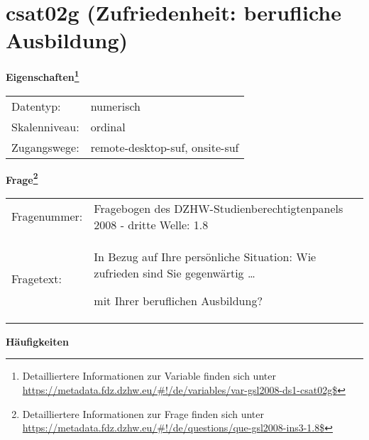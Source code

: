 
    \setcounter{footnote}{0}

    \vspace*{-1.8cm}
	\section{csat02g (Zufriedenheit: berufliche Ausbildung)}
	\label{section:csat02g}



    \vspace*{0.5cm}
    \noindent\textbf{Eigenschaften\footnote{Detailliertere Informationen zur Variable finden sich unter
		\url{https://metadata.fdz.dzhw.eu/\#!/de/variables/var-gsl2008-ds1-csat02g$}}}\\
	\begin{tabularx}{\hsize}{@{}lX}
	Datentyp: & numerisch \\
	Skalenniveau: & ordinal \\
	Zugangswege: &
	  remote-desktop-suf, 
	  onsite-suf
 \\
    \end{tabularx}



				\vspace*{0.5cm}
                \noindent\textbf{Frage\footnote{Detailliertere Informationen zur Frage finden sich unter
		              \url{https://metadata.fdz.dzhw.eu/\#!/de/questions/que-gsl2008-ins3-1.8$}}}\\
				\begin{tabularx}{\hsize}{@{}lX}
					Fragenummer: &
					  Fragebogen des DZHW-Studienberechtigtenpanels 2008 - dritte Welle:
					  1.8
 \\
					Fragetext: & In Bezug auf Ihre persönliche Situation: Wie zufrieden sind Sie gegenwärtig …\par  mit Ihrer beruflichen Ausbildung? \\
				\end{tabularx}





        		\vspace*{0.5cm}
                \noindent\textbf{Häufigkeiten}


